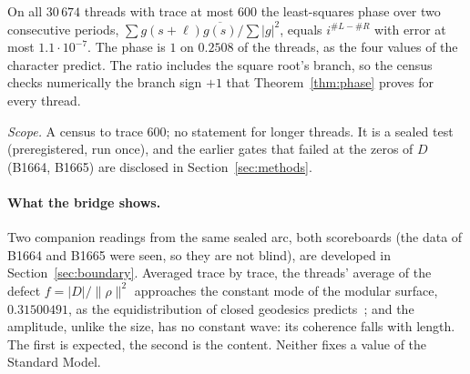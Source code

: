 \begin{censuslaw}\label{cl:phase}
On all $30\,674$ threads with trace at most $600$ the least-squares phase over two consecutive periods,
$\sum g(s+\ell)\overline{g(s)}/\sum|g|^2$, equals $i^{\#L-\#R}$ with error at most $1.1\cdot10^{-7}$. The phase is $1$ on
$0.2508$ of the threads, as the four values of the character predict. The ratio includes the square root's branch, so
the census checks numerically the branch sign $+1$ that Theorem~\ref{thm:phase} proves for every thread.
\end{censuslaw}
\noindent\emph{Scope.} A census to trace $600$; no statement for longer threads. It is a sealed test (preregistered, run
once), and the earlier gates that failed at the zeros of $D$ (B1664, B1665) are disclosed in Section~\ref{sec:methods}.

\paragraph{What the bridge shows.}
Two companion readings from the same sealed arc, both scoreboards (the data of B1664 and B1665 were seen, so they are not
blind), are developed in Section~\ref{sec:boundary}. Averaged trace by trace, the threads' average of the defect
$f=|D|/\|\rho\|^2$ approaches the constant mode of the modular surface, $0.31500491$, as the equidistribution of closed
geodesics predicts~\cite{Duke1988,Sarnak1982}; and the amplitude, unlike the size, has no constant wave: its
coherence falls with length. The first is expected, the second is the content. Neither fixes a value of the Standard Model.
